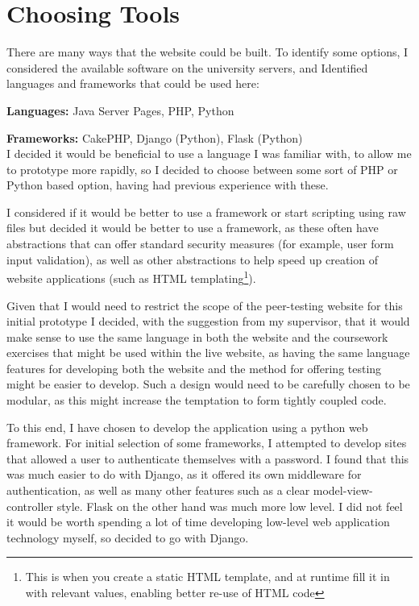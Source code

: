 \documentclass[a4paper,11pt]{report}
\begin{document}
\section{Choosing Tools}
There are many ways that the website could be built. To identify some options, I considered the available software on the university servers, and Identified languages and frameworks that could be used here:\par
\textbf{Languages:} Java Server Pages, PHP, Python\par
\textbf{Frameworks:} CakePHP, Django (Python), Flask (Python)\\
I decided it would be beneficial to use a language I was familiar with, to allow me to prototype more rapidly, so I decided to choose between some sort of PHP or Python based option, having had previous experience with these.\par
I considered if it would be better to use a framework or start scripting using raw files but decided it would be better to use a framework, as these often have abstractions that can offer standard security measures (for example, user form input validation), as well as other abstractions to help speed up creation of website applications (such as HTML templating\footnote{This is when you create a static HTML template, and at runtime fill it in with relevant values, enabling better re-use of HTML code}).\par
Given that I would need to restrict the scope of the peer-testing website for this initial prototype I decided, with the suggestion from my supervisor, that it would make sense to use the same language in both the website and the coursework exercises that might be used within the live website, as having the same language features for developing both the website and the method for offering testing might be easier to develop. Such a design would need to be carefully chosen to be modular, as this might increase the temptation to form tightly coupled code.\par
To this end, I have chosen to develop the application using a python web framework. For initial selection of some frameworks, I attempted to develop sites that allowed a user to authenticate themselves with a password. I found that this was much easier to do with Django, as it offered its own middleware for authentication, as well as many other features such as a clear model-view-controller style. Flask on the other hand was much more low level. I did not feel it would be worth spending a lot of time developing low-level web application technology myself, so decided to go with Django.\par
\end{document}
